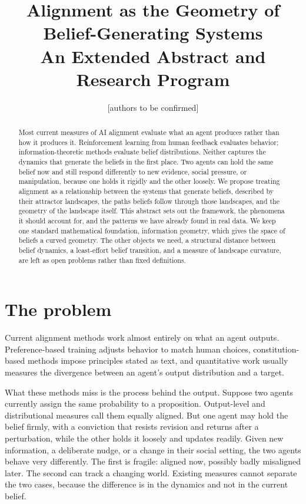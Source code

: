 \documentclass[11pt,a4paper]{article}
\title{Alignment as the Geometry of Belief-Generating Systems\\
\large An Extended Abstract and Research Program}
\author{[authors to be confirmed]}
\date{}
\begin{document}
\maketitle

\begin{abstract}
Most current measures of AI alignment evaluate what an agent produces rather
than how it produces it. Reinforcement learning from human feedback evaluates
behavior; information-theoretic methods evaluate belief distributions. Neither
captures the dynamics that generate the beliefs in the first place. Two agents
can hold the same belief now and still respond differently to new evidence,
social pressure, or manipulation, because one holds it rigidly and the other
loosely. We propose treating alignment as a relationship between the systems
that generate beliefs, described by their attractor landscapes, the paths
beliefs follow through those landscapes, and the geometry of the landscape
itself. This abstract sets out the framework, the phenomena it should account
for, and the patterns we have already found in real data. We keep one standard
mathematical foundation, information geometry, which gives the space of beliefs
a curved geometry. The other objects we need, a structural distance between
belief dynamics, a least-effort belief transition, and a measure of landscape
curvature, are left as open problems rather than fixed definitions.
\end{abstract}

\section{The problem}

Current alignment methods work almost entirely on what an agent outputs.
Preference-based training adjusts behavior to match human choices,
constitution-based methods impose principles stated as text, and quantitative
work usually measures the divergence between an agent's output distribution and
a target.

What these methods miss is the process behind the output. Suppose two agents
currently assign the same probability to a proposition. Output-level and
distributional measures call them equally aligned. But one agent may hold the
belief firmly, with a conviction that resists revision and returns after a
perturbation, while the other holds it loosely and updates readily. Given new
information, a deliberate nudge, or a change in their social setting, the two
agents behave very differently. The first is fragile: aligned now, possibly
badly misaligned later. The second can track a changing world. Existing
measures cannot separate the two cases, because the difference is in the
dynamics and not in the current belief.
\end{document}
